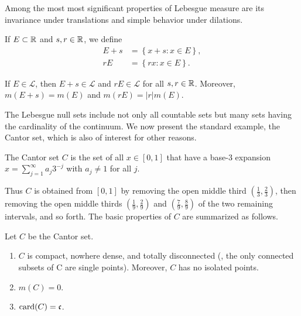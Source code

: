 Among the most most significant properties of Lebesgue measure are its invariance under translations and simple behavior under dilations.

\begin{definition}
    If $E \subset \mathbb{R}$ and $s, r \in \mathbb{R}$, we define
    \begin{align}
        E+s &= \left\{ x + s: x \in E \right\}, \\
        rE &= \left\{ r x : x \in E \right\}.
    \end{align}
\end{definition}

\begin{theorem}
    If $E \in \mathcal{L}$, then $E+s \in \mathcal{L}$ and $rE \in \mathcal{L}$ for all $s, r \in \mathbb{R}$.
    Moreover, $m(E+s) = m(E)$ and $m(r E) = |r| m(E)$.
\end{theorem}

The Lebesgue null sets include not only all countable sets but many sets having the cardinality of the continuum.
We now present the standard example, the Cantor set, which is also of interest for other reasons.

\begin{definition}
    The Cantor set $C$ is the set of all $x \in [0, 1]$ that have a base-3 expansion $x = \sum_{j=1}^{\infty} a_j 3^{-j}$ with $a_j \ne 1$ for all $j$.
\end{definition}

Thus $C$ is obtained from $[0, 1]$ by removing the open middle third $(\frac{1}{3}, \frac{2}{3})$, then removing the open middle thirds $(\frac{1}{9}, \frac{2}{9})$ and $(\frac{7}{9}, \frac{8}{9})$ of the two remaining intervals, and so forth. 
The basic properties of $C$ are summarized as follows.

\begin{proposition}
    Let $C$ be the Cantor set.
    \begin{enumerate}
        \item $C$ is compact, nowhere dense, and totally disconnected (\ie, the only connected subsets of C are single points). Moreover, $C$ has no isolated points.
        \item $m(C) = 0$.
        \item $\mathrm{card}(C) = \mathfrak{c}$.
    \end{enumerate}
\end{proposition}

